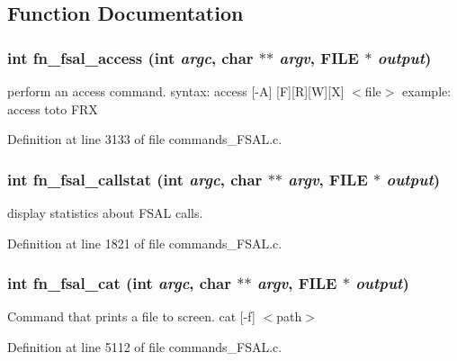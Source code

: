 \subsection{Function Documentation}
\subsubsection[{fn\_\-fsal\_\-access}]{\setlength{\rightskip}{0pt plus 5cm}int fn\_\-fsal\_\-access (int {\em argc}, \/  char $\ast$$\ast$ {\em argv}, \/  FILE $\ast$ {\em output})}\label{commands__FSAL_8c_a55a8451b4dd88ef76baea99bbef6761}


perform an access command. syntax: access [-A] [F][R][W][X] $<$file$>$ example: access toto FRX 

Definition at line 3133 of file commands\_\-FSAL.c.
\subsubsection[{fn\_\-fsal\_\-callstat}]{\setlength{\rightskip}{0pt plus 5cm}int fn\_\-fsal\_\-callstat (int {\em argc}, \/  char $\ast$$\ast$ {\em argv}, \/  FILE $\ast$ {\em output})}\label{commands__FSAL_8c_4acd9c0eb120bb1f3dc888538b1996cb}


display statistics about FSAL calls. 

Definition at line 1821 of file commands\_\-FSAL.c.
\subsubsection[{fn\_\-fsal\_\-cat}]{\setlength{\rightskip}{0pt plus 5cm}int fn\_\-fsal\_\-cat (int {\em argc}, \/  char $\ast$$\ast$ {\em argv}, \/  FILE $\ast$ {\em output})}\label{commands__FSAL_8c_fcf5d8ad163ca5a5aef0952851a37dbf}


Command that prints a file to screen. cat [-f] $<$path$>$ 

Definition at line 5112 of file commands\_\-FSAL.c.
